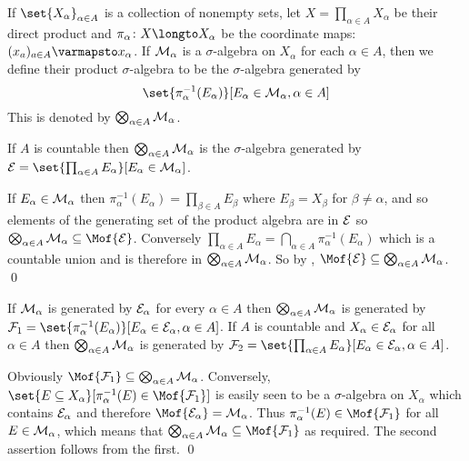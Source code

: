 \bdefn

    If $\set{X_\alpha}_{\alpha\in A}$ is a collection of nonempty sets, let $X=\prod_{\alpha\in A}X_\alpha$ be their direct product and $\pi_\alpha\colon X\longto X_\alpha$ be the coordinate maps:
    $(x_a)_{a\in A}\varmapsto x_\alpha$.
    If ${\cal M}_\alpha$ is a $\sigma$-algebra on $X_\alpha$ for each $\alpha\in A$, then we define their {\emphcolor product $\sigma$-algebra} to be the $\sigma$-algebra generated by
    $$ \set{\pi_\alpha^{-1}(E_\alpha)}[E_\alpha\in{\cal M}_\alpha,\alpha\in A] $$
    This is denoted by $\bigotimes_{\alpha\in A}{\cal M}_\alpha$.

\edefn

\bprop

    If $A$ is countable then $\bigotimes_{\alpha\in A}{\cal M}_\alpha$ is the $\sigma$-algebra generated by ${\cal E}=\set{\prod_{\alpha\in A}E_\alpha}[E_\alpha\in{\cal M}_\alpha]$.

\eprop

If $E_\alpha\in{\cal M}_\alpha$ then $\pi^{-1}_\alpha(E_\alpha)=\prod_{\beta\in A}E_\beta$ where $E_\beta=X_\beta$ for $\beta\neq\alpha$, and so elements of the generating set of the product algebra
are in ${\cal E}$ so $\bigotimes_{\alpha\in A}{\cal M}_\alpha\subseteq\Mof{\cal E}$.
Conversely $\prod_{\alpha\in A}E_\alpha=\bigcap_{\alpha\in A}\pi_\alpha^{-1}(E_\alpha)$ which is a countable union and is therefore in $\bigotimes_{\alpha\in A}{\cal M}_\alpha$.
So by , $\Mof{{\cal E}}\subseteq\bigotimes_{\alpha\in A}{\cal M}_\alpha$.
\qed

\bprop

    If ${\cal M}_\alpha$ is generated by ${\cal E}_\alpha$ for every $\alpha\in A$ then $\bigotimes_{\alpha\in A}{\cal M}_\alpha$ is generated by
    ${\cal F}_1=\set{\pi_\alpha^{-1}(E_\alpha)}[E_\alpha\in{\cal E}_\alpha,\alpha\in A]$.
    If $A$ is countable and $X_\alpha\in{\cal E}_\alpha$ for all $\alpha\in A$ then $\bigotimes_{\alpha\in A}{\cal M}_\alpha$ is generated by
    ${\cal F}_2=\set{\prod_{\alpha\in A}E_\alpha}[E_\alpha\in{\cal E}_\alpha,\alpha\in A]$.

\eprop

Obviously $\Mof{{\cal F}_1}\subseteq\bigotimes_{\alpha\in A}{\cal M}_\alpha$.
Conversely, $\set{E\subseteq X_\alpha}[\pi_\alpha^{-1}(E)\in\Mof{{\cal F}_1}]$ is easily seen to be a $\sigma$-algebra on $X_\alpha$ which contains ${\cal E}_\alpha$ and therefore
$\Mof{{\cal E}_\alpha}={\cal M}_\alpha$.
Thus $\pi_\alpha^{-1}(E)\in\Mof{{\cal F}_1}$ for all $E\in{\cal M}_\alpha$, which means that $\bigotimes_{\alpha\in A}{\cal M}_\alpha\subseteq\Mof{{\cal F}_1}$ as required.
The second assertion follows from the first.
\qed

